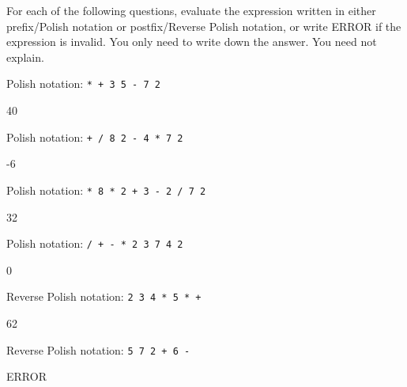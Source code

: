 

For each of the following questions,
evaluate the expression written in either prefix/Polish
notation or postfix/Reverse Polish notation, or write ERROR if the expression is invalid.
You only need to write down the answer. You need not explain.

\nextq
Polish notation:
\verb!* + 3 5 - 7 2!
\\
\ANSWER
\begin{answercode}
40
\end{answercode}

\nextq
Polish notation: \verb!+ / 8 2 - 4 * 7 2!
\\
\ANSWER
\begin{answercode}
-6
\end{answercode}

\nextq
Polish notation: \verb!* 8 * 2 + 3 - 2 / 7 2!
\\
\ANSWER
\begin{answercode}
32
\end{answercode}

\nextq
Polish notation: \verb!/ + - * 2 3 7 4 2!
\\
\ANSWER
\begin{answercode}
0
\end{answercode}

\nextq
Reverse Polish notation: \verb!2 3 4 * 5 * +!
\\
\ANSWER
\begin{answercode}
62
\end{answercode}

\nextq
Reverse Polish notation: \verb!5 7 2 + 6 -!
\\
\ANSWER
\begin{answercode}
ERROR
\end{answercode}

